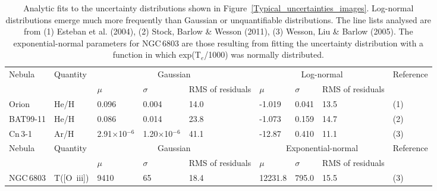 \documentclass[useAMS,usenatbib]{mn2e}
\begin{document}
\begin{table}
\begin{tabular}{lllllllll}
\hline
Nebula & Quantity & \multicolumn{3}{c}{Gaussian} & \multicolumn{3}{c}{Log-normal} & Reference \\
       &          & $\mu$ & $\sigma$ & RMS of residuals & $\mu$ & $\sigma$ & RMS of residuals\\
\hline
Orion    & He/H     & 0.096             & 0.004 & 14.0 & -1.019 & 0.041 & 13.5 & (1) \\
BAT99-11 & He/H     & 0.086             & 0.014 & 23.8 & -1.073 & 0.159 & 14.7 & (2) \\
Cn\,3-1  & Ar/H     & 2.91$\times$10$^{-6}$ & 1.20$\times$10$^{-6}$ & 41.1 & -12.87 & 0.410 & 11.1 & (3) \\
Nebula & Quantity & \multicolumn{3}{c}{Gaussian} & \multicolumn{3}{c}{Exponential-normal} & Reference \\
       &          & $\mu$ & $\sigma$ & RMS of residuals & $\mu$ & $\sigma$ & RMS of residuals\\
NGC\,6803 & T([O~{\sc iii}]) & 9410 & 65 & 18.4 & 12231.8 & 795.0 & 15.5 & (3)\\
\hline
\end{tabular}
\caption{Analytic fits to the uncertainty distributions shown in Figure~\ref{Typical_uncertainties_images}.  Log-normal distributions emerge much more frequently than Gaussian or unquantifiable distributions.  The line lists analysed are from (1) Esteban et al. (2004), (2) Stock, Barlow \& Wesson (2011), (3) Wesson, Liu \& Barlow (2005).  The exponential-normal parameters for NGC\,6803 are those resulting from fitting the uncertainty distribution with a function in which exp(T$_e$/1000) was normally distributed.}
\label{Typical_uncertainties_table}
\end{table}
\end{document}
